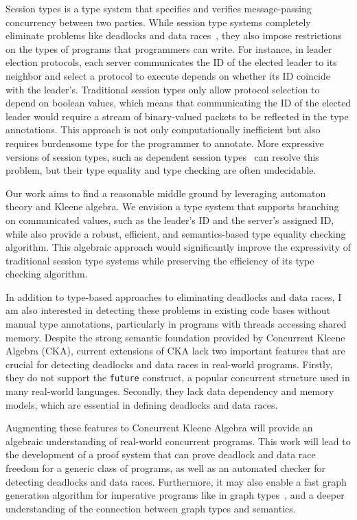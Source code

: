 \documentclass[11pt,a4paper,sans]{moderncv} %
\begin{document}
Session types is a type system that specifies and verifies message-passing concurrency between two parties. 
While session type systems completely eliminate problems like deadlocks and data races~\cite{caires_SessionTypesIntuitionistic_2010,wadler_PropositionsSessions_2012}, they also impose restrictions on the types of programs that programmers can write.
For instance, in leader election protocols, each server communicates the ID of the elected leader to its neighbor and select a protocol to execute depends on whether its ID coincide with the leader's. 
Traditional session types only allow protocol selection to depend on boolean values, which means that communicating the ID of the elected leader would require a stream of binary-valued packets to be reflected in the type annotations. 
This approach is not only computationally inefficient but also requires burdensome type for the programmer to annotate. 
More expressive versions of session types, such as dependent session types~\cite{toninho_DependentSessionTypes_2011,toninho_DecadeDependentSession_2021} can resolve this problem, but their type equality and type checking are often undecidable.

Our work aims to find a reasonable middle ground by leveraging automaton theory and Kleene algebra. 
We envision a type system that supports branching on communicated values, such as the leader's ID and the server's assigned ID, while also provide a robust, efficient, and semantics-based type equality checking algorithm. 
This algebraic approach would significantly improve the expressivity of traditional session type systems while preserving the efficiency of its type checking algorithm.


In addition to type-based approaches to eliminating deadlocks and data races, I am also interested in detecting these problems in existing code bases without manual type annotations, particularly in programs with threads accessing shared memory.
Despite the strong semantic foundation provided by Concurrent Kleene Algebra (CKA), current extensions of CKA lack two important features that are crucial for detecting deadlocks and data races in real-world programs. 
Firstly, they do not support the \texttt{future} construct, a popular concurrent structure used in many real-world languages. 
Secondly, they lack data dependency and memory models, which are essential in defining deadlocks and data races.

Augmenting these features to Concurrent Kleene Algebra will provide an algebraic understanding of real-world concurrent programs. 
This work will lead to the development of a proof system that can prove deadlock and data race freedom for a generic class of programs, as well as an automated checker for detecting deadlocks and data races. 
Furthermore, it may also enable a fast graph generation algorithm for imperative programs like in graph types~\cite{muller_LanguageAgnosticStaticDeadlock_2024a}, and a deeper understanding of the connection between graph types and semantics.
\end{document}
